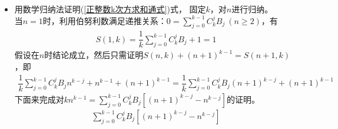 \begin{itemize}[leftmargin=\inteval{\myitemleftmargin}pt,itemsep=
   \inteval{\myitemitempsep}pt,topsep=\inteval{\myitemtopsep}pt]
若$k$是奇数，则$ S(n,k) $经过因式分解后总会包含
$ \dfrac{1}{6}n(n+1)(2n+1) $.
将$ S(n,k) $对变量$ n $求偏导\footnote{此时可以假想$ n $是连续变量。}，
也能发现一些规律，比如
\begin{align*}
    S(n,6) =&\ \dfrac{n^6}{6} +\dfrac{n^5}{2}+\dfrac{5n^4}{12}-\dfrac{n^2}{12}\\
    \dfrac{\partial S}{\partial n}(n,6)=&\ n^5+\dfrac{5n^4}{2}+
    \dfrac{5n^3}{3}-\dfrac{n}{6}=5S(n,5)+B_5 \\
    S(n,5) =&\ \dfrac{n^5}{5}+\dfrac{n^4}{2}+\dfrac{n^3}{3}-\dfrac{n}{30} \\
    \dfrac{\partial S}{\partial n}(n,5)=&\ n^4+2n^3+n^2-\dfrac{1}{30}=4S(n,4)+B_4
\end{align*}
该规律就是：$ \dfrac{\partial S}{\partial n}(n,k+1)=kS(n,k)+B_k $，证明如下：
\begin{align*}
    &\ \dfrac{\partial S}{\partial n}\left(\dfrac{1}{k+1}\sum_{j=0}^{k}
    C_{k+1}^{j}B_{j}n^{k+1-j}+n^{k}\right)-B_k\\
    =&\ \sum_{j=0}^{k}\dfrac{k+1-j}{k+1}C_{k+1}^{j}B_{j}n^{k-j}+kn^{k-1}-B_k \\
    =&\ \sum_{j=0}^{k-1}C_{k}^{j}B_{j}n^{k-j}+kn^{k-1} \\
    =&\ k\left(\dfrac{1}{k}\sum_{j=0}^{k-1}C_{k}^{j}B_{j}n^{k-j}+n^{k-1} \right)  \\
    =&\ kS(n,k)
\end{align*}
上面用到了$ \dfrac{k+1-j}{k+1}C_{k+1}^j=\dfrac{k+1-j}{k+1}\cdot
\dfrac{(k+1)!}{(k+1-j)!j!}=\dfrac{k!}{(k-j)!j!}=C_k^j $.
\item 用数学归纳法证明(\ref{正整数k次方求和通式})式，
固定$ k $，对$ n $进行归纳。\\
当$ n=1 $时，利用伯努利数满足递推关系：$ 0=\sum\limits_{j=0}^{k-1}C_k^jB_j\ (n\geq 2) $，有
\begin{align*}
    S(1,k)=\dfrac{1}{k}\sum_{j=0}^{k-1}C_{k}^{j}B_{j}+1=1
\end{align*}
假设在$ n $时结论成立，然后只需证明$ S(n,k)+(n+1)^{k-1}=S(n+1,k) $，即
\begin{align*}
    \dfrac{1}{k}\sum_{j=0}^{k-1}C_{k}^{j}B_{j}n^{k-j}+n^{k-1}+(n+1)^{k-1}
    =\dfrac{1}{k}\sum_{j=0}^{k-1}C_{k}^{j}B_{j}(n+1)^{k-j}+(n+1)^{k-1}
\end{align*}
下面来完成对$ kn^{k-1} =\sum\limits_{j=0}^{k-1}C_{k}^{j}B_{j}\left[
(n+1)^{k-j}-n^{k-j}\right] $的证明。
{\small \begin{align*}
        \sum\limits_{j=0}^{k-1}C_{k}^{j}B_{j}\left[(n+1)^{k-j}-n^{k-j}\right] 

\end{align*}}
\end{itemize}
